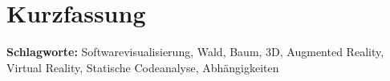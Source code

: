 \chapter*{Kurzfassung}
\thispagestyle{empty}
\bigskip

\noindent
\textbf{Schlagworte:} Softwarevisualisierung, Wald, Baum, 3D, Augmented Reality, Virtual Reality, Statische Codeanalyse, Abhängigkeiten
